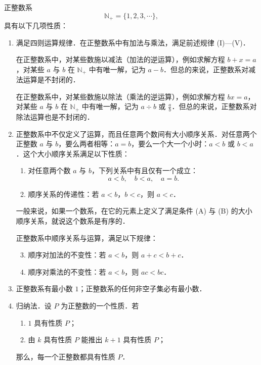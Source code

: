 \begin{example}
正整数系
\[
\mathbb{N}_+ = \{1,2,3,\cdots\},
\]
具有以下几项性质：
\begin{enumerate}[label=\arabic*.]
  \item 满足四则运算规律．在正整数系中有加法与乘法，满足前述规律 (I)—(V)．

  在正整数系中，对某些数施以减法（加法的逆运算），例如求解方程 $b+x=a$，对某些 $a$ 与 $b$ 在 $\mathbb{N}_+$ 中有唯一解，记为 $a-b$．但总的来说，正整数系对减法运算是不封闭的．

  在正整数系中，对某些数施以除法（乘法的逆运算），例如求解方程 $bx=a$，对某些 $a$ 与 $b$ 在 $\mathbb{N}_+$ 中有唯一解，记为 $a\div b$ 或 $\frac{a}{b}$．但总的来说，正整数系对除法运算也是不封闭的．

  \item 正整数系中不仅定义了运算，而且任意两个数间有大小顺序关系．对任意两个正整数 $a$ 与 $b$，要么两者相等：$a=b$，要么一个大一个小时：$a<b$ 或 $b<a$．这个大小顺序关系满足以下性质：
  \begin{enumerate}[label=(\Alph*)]
    \item 对任意两个数 $a$ 与 $b$，下列关系中有且仅有一个成立：
    \[
    a<b,\quad b<a,\quad a=b.
    \]
    \item 顺序关系的传递性：若 $a<b$，$b<c$，则 $a<c$．
  \end{enumerate}
  一般来说，如果一个数系，在它的元素上定义了满足条件 (A) 与 (B) 的大小顺序关系，就说这个数系是有序的．

  正整数系中顺序关系与运算，满足以下规律：
  \begin{enumerate}[label=(\Alph*)]
    \setcounter{enumii}{2}
    \item 顺序对加法的不变性：若 $a<b$，则 $a+c<b+c$．
    \item 顺序对乘法的不变性：若 $a<b$，则 $ac<bc$．
  \end{enumerate}

  \item 正整数系有最小数 $1$；正整数系的任何非空子集必有最小数．

  \item 归纳法．设 $P$ 为正整数的一个性质．若
  \begin{enumerate}[label=(\roman*)]
    \item $1$ 具有性质 $P$；
    \item 由 $k$ 具有性质 $P$ 能推出 $k+1$ 具有性质 $P$；
  \end{enumerate}
  那么，每一个正整数都具有性质 $P$．
\end{enumerate}
\end{example}


